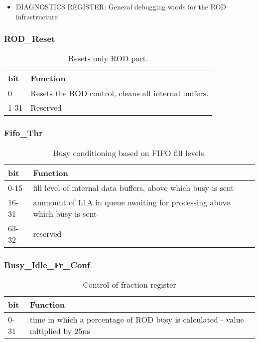 \begin{itemize}
\item DIAGNOSTICS REGISTER: General debugging words for the ROD infrastructure
\end{itemize}



\subsubsection{ROD\_Reset}
\begin {table}[H]
\begin{center}
\begin{tabular}{|l|l|}
\hline
\textbf{bit} & \textbf{Function} \\
\hline
0 & Resets the ROD control, cleans all internal buffers. \\
\hline
1-31 & Reserved \\
\hline
\end{tabular}
\caption{Resets only ROD part.}
\end{center}
\end{table}

\subsubsection{ Fifo\_Thr}
\begin {table}[H]
\begin{center}
\begin{tabular}{|l|l|}
\hline
\textbf{bit} & \textbf{Function} \\
\hline
0-15 & fill level of internal data buffers, above which busy is sent\\
\hline
16-31 & ammount of L1A in queue awaiting for processing above which busy is sent \\
\hline
63-32 & reserved \\
\hline
\end{tabular}
\caption{Busy conditioning based on FIFO fill levels.}
\end{center}
\end{table}

\subsubsection{Busy\_Idle\_Fr\_Conf}
\begin {table}[H]
\begin{center}
\begin{tabular}{|l|l|}
\hline
\textbf{bit} & \textbf{Function} \\
\hline
0-31 & time in which a percentage of ROD busy is calculated - value mltiplied by 25ns\\
\hline
\end{tabular}
\caption{Control of fraction register}
\end{center}
\end{table}

